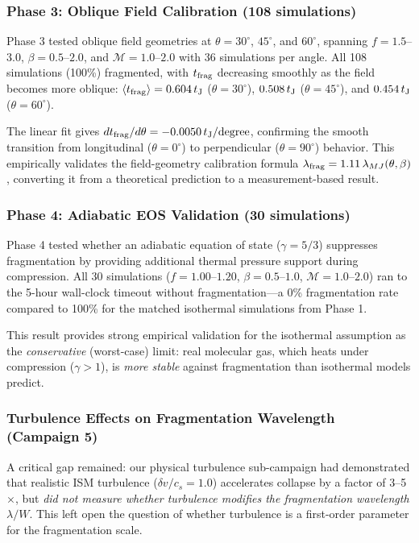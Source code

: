 \documentclass[twocolumn,usenatbib]{mnras}
\begin{document}
\subsubsection{Phase 3: Oblique Field Calibration (108 simulations)}

Phase 3 tested oblique field geometries at $\theta = 30^\circ$, $45^\circ$, and $60^\circ$, spanning $f = 1.5$--$3.0$, $\beta = 0.5$--$2.0$, and $\mathcal{M} = 1.0$--$2.0$ with 36 simulations per angle. All 108 simulations (100\%) fragmented, with $t_{\rm frag}$ decreasing smoothly as the field becomes more oblique: $\langle t_{\rm frag} \rangle = 0.604\,t_{\rm J}$ ($\theta = 30^\circ$), $0.508\,t_{\rm J}$ ($\theta = 45^\circ$), and $0.454\,t_{\rm J}$ ($\theta = 60^\circ$).

The linear fit gives $dt_{\rm frag}/d\theta = -0.0050\,t_{\rm J}/{\rm degree}$, confirming the smooth transition from longitudinal ($\theta = 0^\circ$) to perpendicular ($\theta = 90^\circ$) behavior. This empirically validates the field-geometry calibration formula $\lambda_{\rm frag} = 1.11\,\lambda_{MJ}(\theta, \beta)$, converting it from a theoretical prediction to a measurement-based result.

\subsubsection{Phase 4: Adiabatic EOS Validation (30 simulations)}

Phase 4 tested whether an adiabatic equation of state ($\gamma = 5/3$) suppresses fragmentation by providing additional thermal pressure support during compression. All 30 simulations ($f = 1.00$--$1.20$, $\beta = 0.5$--$1.0$, $\mathcal{M} = 1.0$--$2.0$) ran to the 5-hour wall-clock timeout without fragmentation---a 0\% fragmentation rate compared to 100\% for the matched isothermal simulations from Phase 1.

This result provides strong empirical validation for the isothermal assumption as the {\it conservative} (worst-case) limit: real molecular gas, which heats under compression ($\gamma > 1$), is {\it more stable} against fragmentation than isothermal models predict.

\subsubsection{Turbulence Effects on Fragmentation Wavelength (Campaign 5)}

A critical gap remained: our physical turbulence sub-campaign had demonstrated that realistic ISM turbulence ($\delta v/c_s = 1.0$) accelerates collapse by a factor of 3--5$\times$, but \textit{did not measure whether turbulence modifies the fragmentation wavelength $\lambda/W$}. This left open the question of whether turbulence is a first-order parameter for the fragmentation scale.
\end{document}
